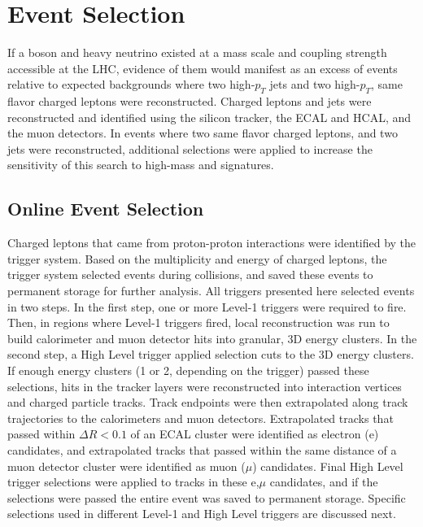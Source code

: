 \chapter{Event Selection}
\label{sec:event_selection_chapter}

If a \WR boson and heavy neutrino \nul existed at a mass scale and coupling strength accessible 
at the LHC, evidence of them would manifest as an excess of events relative to expected backgrounds 
where two high-$p_{T}$ jets and two high-$p_{T}$, same flavor charged leptons were reconstructed.  
Charged leptons and jets were reconstructed and identified using the silicon tracker, the ECAL and 
HCAL, and the muon detectors.  In events where two same flavor charged leptons, and two jets were 
reconstructed, additional selections were applied to increase the sensitivity of this search to 
high-mass \WR and \nul signatures.

\section{Online Event Selection}
\label{sec:triggers}
Charged leptons that came from proton-proton interactions were identified by the trigger system.  Based 
on the multiplicity and energy of charged leptons, the trigger system selected events during 
collisions, and saved these events to permanent storage for further analysis.  All triggers presented 
here selected events in two steps.  In the first step, one or more Level-1 triggers were 
required to fire.  Then, in regions where Level-1 triggers fired, local reconstruction was run to 
build calorimeter and muon detector hits into granular, 3D energy clusters.  In the second step, 
a High Level trigger applied selection cuts to the 3D energy clusters.  If 
enough energy clusters (1 or 2, depending on the trigger) passed these selections, hits in the tracker 
layers were reconstructed into interaction vertices and charged particle tracks.  Track endpoints 
were then extrapolated along track trajectories to the calorimeters and muon detectors.  Extrapolated 
tracks that passed within $\Delta R < 0.1$ of an ECAL cluster were identified as electron (e) 
candidates, and extrapolated tracks that passed within the same distance of a muon detector cluster 
were identified as muon ($\mu$) candidates.  Final High Level trigger selections were applied to 
tracks in these e,$\mu$ candidates, and if the selections were passed the entire event was saved 
to permanent storage.  Specific selections used in different Level-1 and High Level triggers are 
discussed next.

